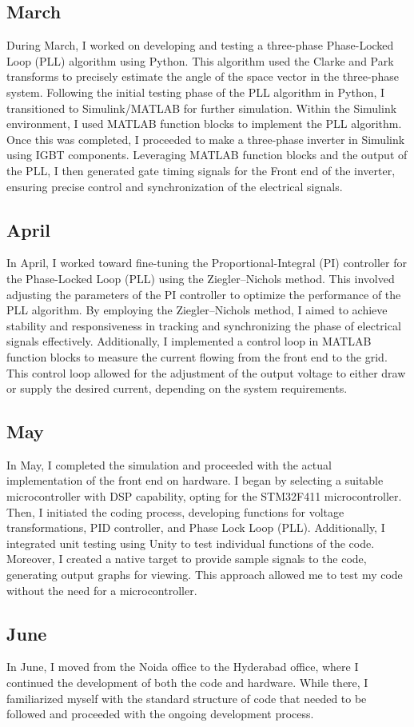 \subsection{March}

During March, I worked on developing and testing a three-phase Phase-Locked
Loop (PLL) algorithm using Python. This algorithm used the Clarke and Park
transforms to precisely estimate the angle of the space vector in the
three-phase system. Following the initial testing phase of the PLL algorithm in
Python, I transitioned to Simulink/MATLAB for further simulation. Within the
Simulink environment, I used MATLAB function blocks to implement the PLL
algorithm. Once this was completed, I proceeded to make a three-phase inverter
in Simulink using IGBT components. Leveraging MATLAB function blocks and the
output of the PLL, I then generated gate timing signals for the Front end of
the inverter, ensuring precise control and synchronization of the electrical
signals.

\subsection{April}

In April, I worked toward fine-tuning the Proportional-Integral (PI) controller
for the Phase-Locked Loop (PLL) using the Ziegler–Nichols method. This involved
adjusting the parameters of the PI controller to optimize the performance of
the PLL algorithm. By employing the Ziegler–Nichols method, I aimed to achieve
stability and responsiveness in tracking and synchronizing the phase of
electrical signals effectively. Additionally, I implemented a control loop in
MATLAB function blocks to measure the current flowing from the front end to the
grid. This control loop allowed for the adjustment of the output voltage to
either draw or supply the desired current, depending on the system
requirements.

\subsection{May}
In May, I completed the simulation and proceeded with the actual implementation
of the front end on hardware. I began by selecting a suitable microcontroller
with DSP capability, opting for the STM32F411 microcontroller. Then, I
initiated the coding process, developing functions for voltage transformations,
PID controller, and Phase Lock Loop (PLL). Additionally, I integrated unit
testing using Unity to test individual functions of the code. Moreover, I
created a native target to provide sample signals to the code, generating
output graphs for viewing. This approach allowed me to test my code without the
need for a microcontroller.

\subsection{June}
In June, I moved from the Noida office to the Hyderabad office, where I
continued the development of both the code and hardware. While there, I
familiarized myself with the standard structure of code that needed to be
followed and proceeded with the ongoing development process.